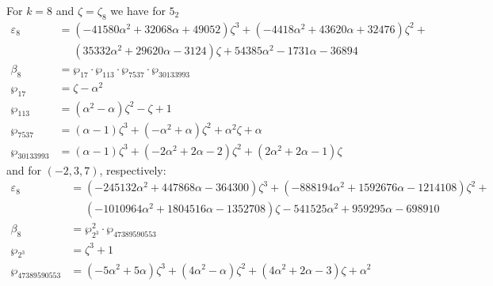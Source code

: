 \documentclass[12pt]{amsart}
\theoremstyle{definition}
\def\a{\alpha}
\def\z{\zeta}
\def\z{\zeta}
\begin{document}

\noindent 
For $k=8$ and $\zeta=\zeta_8$ we have for $5_2$
{\small
\begin{align*}
\varepsilon_{8} &= 
(-41580 \a^2 + 32068 \a + 49052) \z^3 + (-4418 \a^2 + 43620 \a + 32476) \z^2 + 
\\ & \quad\,\,
(35332 \a^2 + 29620 \a - 3124) \z + 54385 \a^2 - 1731 \a - 36894
\\
\beta_{8} &= \wp_{17} \cdot \wp_{113} \cdot \wp_{7537} 
\cdot \wp_{30133993}\\
\wp_{17} &= \z - \a^2
\\
\wp_{113} &=(\a^2 - \a) \z^2 - \z + 1
\\
\wp_{7537} &=(\a - 1) \z^3 + (-\a^2 + \a) \z^2 + \a^2 \z + \a
\\
\wp_{30133993} &=
(\a - 1) \z^3 + (-2 \a^2 + 2 \a - 2) \z^2 + (2 \a^2 + 2 \a - 1) \z
\end{align*}
}
and for $(-2,3,7)$, respectively:
{\small
\begin{align*}
\varepsilon_{8} &= 
(-245132 \a^2 + 447868 \a - 364300) \z^3 + (-888194 \a^2 + 1592676 \a - 1214108) \z^2 + 
\\ & \quad\,\,
(-1010964 \a^2 + 1804516 \a - 1352708) \z - 541525 \a^2 + 959295 \a - 698910
\\
\beta_{8} &= \wp_{2^3}^2 \cdot \wp_{47389590553} \\
\wp_{2^3} &=\z^3 + 1
\\
\wp_{47389590553} &=
(-5 \a^2 + 5 \a) \z^3 + (4 \a^2 - \a) \z^2 + (4 \a^2 + 2 \a - 3) \z + \a^2
\end{align*}
}
\end{document}
